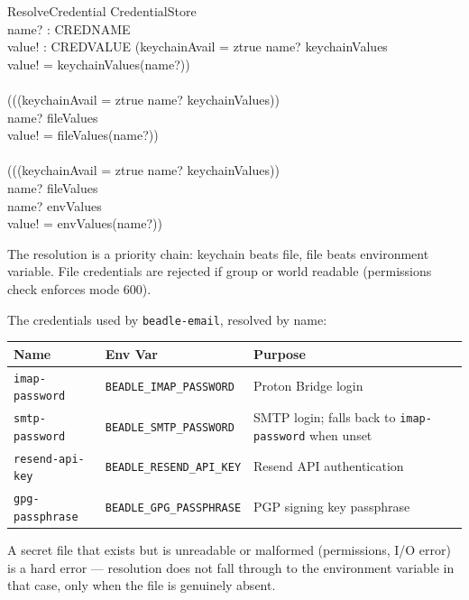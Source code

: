 \documentclass[a4paper,10pt,fleqn]{article}
\begin{document}
\begin{schema}{ResolveCredential}
  \Xi CredentialStore \\
  name? : CREDNAME \\
  value! : CREDVALUE
  \where
  (keychainAvail = ztrue \land name? \in \dom keychainValues \\
  \quad \implies value! = keychainValues(name?)) \\
  \land \\
  ((\lnot (keychainAvail = ztrue \land name? \in \dom keychainValues)) \\
  \quad \land name? \in \dom fileValues \\
  \quad \implies value! = fileValues(name?)) \\
  \land \\
  ((\lnot (keychainAvail = ztrue \land name? \in \dom keychainValues)) \\
  \quad \land name? \notin \dom fileValues \\
  \quad \land name? \in \dom envValues \\
  \quad \implies value! = envValues(name?))
\end{schema}

The resolution is a priority chain: keychain beats file, file beats
environment variable.  File credentials are rejected if group or
world readable (permissions check enforces mode 600).

The credentials used by \texttt{beadle-email}, resolved by name:

\begin{center}
\begin{tabular}{@{}lll@{}}
\toprule
\textbf{Name} & \textbf{Env Var} & \textbf{Purpose} \\
\midrule
\texttt{imap-password}   & \texttt{BEADLE\_IMAP\_PASSWORD}   & Proton Bridge login \\
\texttt{smtp-password}   & \texttt{BEADLE\_SMTP\_PASSWORD}   & SMTP login; falls back to \texttt{imap-password} when unset \\
\texttt{resend-api-key}  & \texttt{BEADLE\_RESEND\_API\_KEY}  & Resend API authentication \\
\texttt{gpg-passphrase}  & \texttt{BEADLE\_GPG\_PASSPHRASE}  & PGP signing key passphrase \\
\bottomrule
\end{tabular}
\end{center}

A secret file that exists but is unreadable or malformed (permissions,
I/O error) is a hard error --- resolution does not fall through to the
environment variable in that case, only when the file is genuinely
absent.
\end{document}
